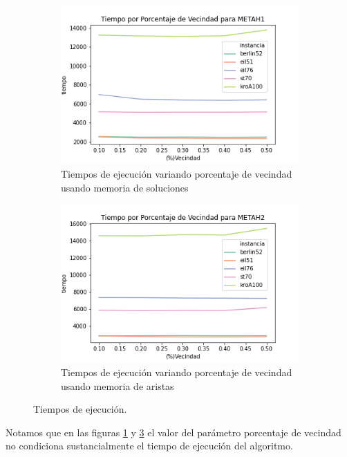 \documentclass[10pt,a4paper]{article}
\begin{document}
\begin{figure}[h!]
    \centering
    \begin{subfigure}{0.45\linewidth}
        \centering
        \includegraphics[scale=0.35]{Graphs-metaH/vecindad-tiempo-METAH1.png}
        \caption{Tiempos de ejecución variando porcentaje de vecindad usando memoria de soluciones}
        \label{fig:exp_porc_tiempo_metah1}
    \end{subfigure}
    \begin{subfigure}{0.45\linewidth}
        \centering
        \includegraphics[scale=0.35]{Graphs-metaH/vecindad-tiempo-METAH2.png}
        \caption{Tiempos de ejecución variando porcentaje de vecindad usando memoria de aristas}
        \label{fig:exp_porc_tiempo_metah2}
    \end{subfigure}
    \caption{Tiempos de ejecución.}
\end{figure}

Notamos que en las figuras \ref{fig:exp_porc_tiempo_metah1} y \ref{fig:exp_porc_tiempo_metah2} el valor del parámetro porcentaje de vecindad no condiciona sustancialmente el tiempo de ejecución del algoritmo.
\end{document}
